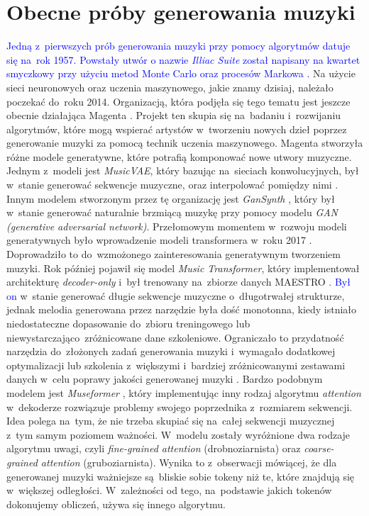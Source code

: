 \documentclass[data-science]{agh-wi} %
\begin{document}
\section{Obecne próby generowania muzyki}
\textcolor{blue}{Jedną z~pierwszych prób generowania muzyki przy pomocy algorytmów datuje się na~rok 1957. Powstały utwór o nazwie \textit{Illiac Suite} został napisany na kwartet smyczkowy przy użyciu metod Monte Carlo oraz procesów Markowa \cite*{komuter_gra}.} Na użycie sieci neuronowych oraz uczenia maszynowego, jakie znamy dzisiaj, należało poczekać do~roku 2014. Organizacją, która podjęła się tego tematu jest jeszcze obecnie działająca Magenta \cite*{magenta}. Projekt ten skupia się na~badaniu i~rozwijaniu algorytmów, które mogą wspierać artystów w~tworzeniu nowych dzieł poprzez generowanie muzyki za pomocą technik uczenia maszynowego. Magenta stworzyła różne modele generatywne, które potrafią komponować nowe utwory muzyczne. Jednym z~modeli jest \textit{MusicVAE}, który bazując na~sieciach konwolucyjnych, był w~stanie generować sekwencje muzyczne, oraz interpolować pomiędzy nimi \cite*{musicvae}. Innym modelem stworzonym przez tę organizację jest \textit{GanSynth} \cite*{engel2018gansynth}, który był w~stanie generować naturalnie brzmiącą muzykę przy pomocy modelu \textit{GAN (generative adversarial network)}. Przełomowym momentem w~rozwoju modeli generatywnych było wprowadzenie modeli transformera w~roku 2017 \cite*{attention}. Doprowadziło to do~wzmożonego zainteresowania generatywnym tworzeniem muzyki. Rok później pojawił się model \textit{Music Transformer}, który implementował architekturę \textit{decoder-only} i~był trenowany na~zbiorze danych MAESTRO \cite*{huang2018music}. \textcolor{blue}{Był on} w~stanie generować długie sekwencje muzyczne o~długotrwałej strukturze, jednak melodia generowana przez narzędzie była dość monotonna, kiedy istniało niedostateczne dopasowanie do~zbioru treningowego lub niewystarczająco~zróżnicowane dane szkoleniowe. Ograniczało to przydatność narzędzia do~złożonych zadań generowania muzyki i~wymagało dodatkowej optymalizacji lub szkolenia z~większymi i~bardziej zróżnicowanymi zestawami danych w~celu poprawy jakości generowanej muzyki \cite*{zhu2023survey}. Bardzo podobnym modelem jest \textit{Museformer} \cite*{yu2022museformer}, który implementując inny rodzaj algorytmu \textit{attention} w~dekoderze rozwiązuje problemy swojego poprzednika z~rozmiarem sekwencji. Idea polega na~tym, że nie trzeba skupiać się na~całej sekwencji muzycznej z~tym samym poziomem ważności. W~modelu zostały wyróżnione dwa rodzaje algorytmu uwagi, czyli \textit{fine-grained attention} (drobnoziarnista) oraz \textit{coarse-grained attention} (gruboziarnista). Wynika to z~obserwacji mówiącej, że dla generowanej muzyki ważniejsze są~bliskie sobie tokeny niż te, które znajdują się w~większej odległości. W~zależności od tego, na~podstawie jakich tokenów dokonujemy obliczeń, używa się innego algorytmu.
\end{document}
